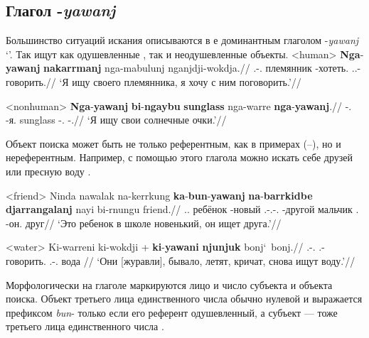 \subsection{Глагол -\textit{yawanj}}
\label{sec:yaw}
Большинство ситуаций искания описываются в  е доминантным глаголом -\textit{yawanj} `\yaw'. Так ищут как одушевленные , так и неодушевленные  объекты.
\ex<human>\begingl
\gla \textbf{Nga}-\textbf{yawanj} \textbf{nakarrmanj} nga-mabulunj nganjdji-wokdja.//
\glb \Fsg.\Real-\yaw.\Np{} племянник \nga-хотеть.\Np{} \Fdu.\Excl.\Fut-говорить.\Np{}//
\glft `Я ищу своего племянника, я хочу с ним поговорить.'//%
\endgl \xe

\ex<nonhuman> \begingl
\gla \textbf{Nga}-\textbf{yawanj} \textbf{bi}-\textbf{ngaybu} \textbf{sunglass} nga-warre \textbf{nga}-\textbf{yawanj}.//
\glb \nga-\yaw.\Np{} \bi-я.\Gen{} sunglass \nga-\warre.\Np{} \nga-\yaw.\Np{}//
\glft `Я ищу свои солнечные очки.'//%
\endgl \xe

Объект поиска может быть не только референтным, как в примерах (--), но и нереферентным. Например, с помощью этого глагола можно искать себе друзей  или пресную воду .

\ex<friend> \begingl
\gla Ninda nawalak na-kerrkung \textbf{ka}-\textbf{bun}-\textbf{yawanj} \textbf{na}-\textbf{barrkidbe} \textbf{djarrangalanj} nayi bi-rnungu friend.//
\glb \Dem.\Prox.\Cli{} ребёнок \Cli-новый \Tsg.\Real-\Tsg.\Obj-\yaw.\Np{} \Cli-другой мальчик \Nm.\Cli{} \bi-он.\Gen{} друг//
\glft `Это ребенок в школе новенький, он ищет друга.'//%
\endgl \xe

\ex<water>\begingl
\gla Ki-warreni ki-wokdji + \textbf{ki}-\textbf{yawani} \textbf{njunjuk} bonj\char`~bonj.//
\glb \Tsg.\irrpst-\warre.\irrpst{} \Tsg.\irrpst-говорить.\irrpst{} \Tsg.\irrpst-\yaw.\irrpst{} вода \rdp\bonj{}//
\glft `Они [журавли], бывало, летят, кричат, снова ищут воду.'//%
\endgl \xe

Морфологически на глаголе маркируются лицо и число субъекта и объекта поиска. Объект третьего лица единственного числа обычно нулевой и выражается префиксом \textit{bun}- только если его референт одушевленный, а субъект --- тоже третьего лица единственного числа .


